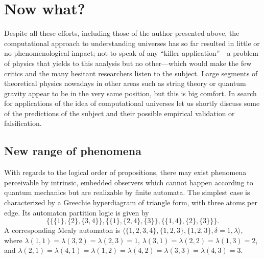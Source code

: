 \documentclass[pre,preprint,showpacs,showkeys,amsfonts]{revtex4}
\begin{document}
\section{Now what?}

Despite all these efforts,  including those of the author presented above,
 the computational approach to understanding  universes has so far resulted in little
or no phenomenological impact;
not to speak of any ``killer application''---a problem of physics
that yields to this analysis but no other---which
would make the few critics and the many
hesitant researchers listen to the subject.
Large segments of theoretical physics nowadays in other areas such as string theory or quantum gravity
appear to be in the very same position, but  this
is big comfort.
In search for applications of the idea of
computational universes
let us shortly discuss some of the predictions of the subject and
their possible empirical validation or falsification.


\subsection{New range of phenomena}
With regards to the logical order of propositions,
there may exist phenomena perceivable
by intrinsic, embedded observers which cannot happen according to
quantum mechanics but are realizable by finite automata.
The simplest case is characterized by a Greechie hyperdiagram of triangle form,
with three atoms per edge. Its automaton partition logic is given by
\begin{equation}
\{
\{\{1\},\{2\},\{3,4\}\},
\{\{1\},\{2,4\},\{3\}\},
\{\{1,4\},\{2\},\{3\}\}
\}.
\label{2003-cu-e-nc}
\end{equation}
A corresponding Mealy automaton is
$\langle \{1,2,3,4\},\{1,2,3\},\{1,2,3\},\delta =1 ,\lambda \rangle$, where
$
\lambda (1,1)=
\lambda (3,2)=
\lambda (2,3)=
1
$,
$
\lambda (3,1)=
\lambda (2,2)=
\lambda (1,3)=
2
$, and
$
\lambda (2,1)= \lambda (4,1)=
\lambda (1,2)= \lambda (4,2)=
\lambda (3,3)= \lambda (4,3)=
3
$.
\end{document}
